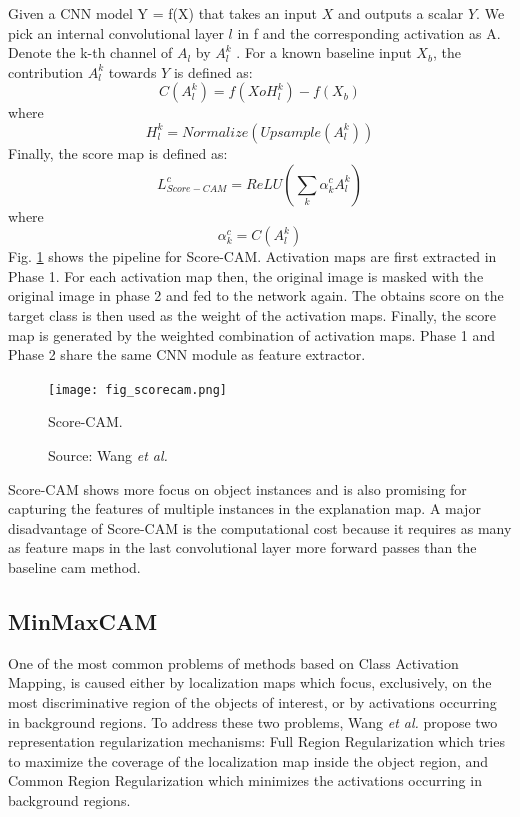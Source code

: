 Given a CNN model Y = f(X) that takes an input $X$ and outputs a scalar $Y$. We pick an internal convolutional layer $l$ in f and the corresponding activation as A. Denote the
k-th channel of $A_l$ by $A^k_l$ . For a known baseline input $X_b$,
the contribution $A^k_l$ towards $Y$ is defined as:
\begin{equation}
    C(A^k_l) = f(X o H^k_l) - f(X_b)
\end{equation}
where
\begin{equation}
    H^k_l = Normalize(Upsample(A^k_l))
\end{equation}
Finally, the score map is defined as:
\begin{equation}
    L^{c}_{Score-CAM} = ReLU(\sum_{k} \alpha^{c}_{k} A^k_l)
\end{equation}
where
\begin{equation}
    \alpha^{c}_{k} = C(A^k_l)
\end{equation}
Fig. \ref{fig:scorecam} shows the pipeline for Score-CAM. Activation maps are first extracted in Phase 1. For each activation map then, the original image is masked with the original image in phase 2 and fed to the network again. The obtains score on the target class is then used as the weight of the activation maps. Finally, the score map is generated by the weighted combination of activation maps. Phase 1 and Phase 2 share the same CNN module as feature extractor. 
\begin{figure}[ht]
    \begin{center}       
    \texttt{[image: fig\_scorecam.png]}
    \caption[Score-CAM]{Score-CAM.}
    \caption*{Source: Wang \textit{et al.} \cite{wang2020score}}
    \label{fig:scorecam}
    \end{center}
\end{figure}

Score-CAM shows more focus on object instances and is also promising for capturing the features of multiple instances in the explanation map. A major disadvantage of Score-CAM is the computational cost because it requires as many as feature maps in the last convolutional layer more forward passes than the baseline \acrshort{cam} method.

\subsection{MinMaxCAM}
One of the most common problems of methods based on Class Activation Mapping,
is caused either by localization maps which focus, exclusively, on the most discriminative region of the objects of interest, or by activations occurring
in background regions. To address these two problems, Wang \textit{et al.} \cite{wang2021minmaxcam} propose two representation regularization mechanisms: Full Region Regularization which tries to maximize the coverage of the localization map inside the object region, and Common Region Regularization which minimizes the activations occurring in background regions.


